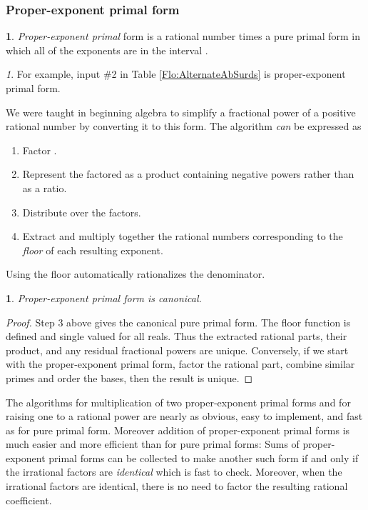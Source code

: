 \documentclass[12pt,english]{article}
\theoremstyle{definition}
\newtheorem*{defn*}{\protect\definitionname}
\theoremstyle{remark}
\newtheorem*{rem*}{\protect\remarkname}
\theoremstyle{plain}
\theoremstyle{plain}
\newtheorem{prop}[thm]{\protect\propositionname}
\providecommand{\definitionname}{Definition}
\providecommand{\propositionname}{Proposition}
\providecommand{\remarkname}{Remark}
\begin{document}
\subsubsection{Proper-exponent primal form\label{sub:Proper-primal-forms}\emph{\vspace{0.3em}
}}
\begin{defn*}
\textsl{Proper-exponent primal} form is a rational number times a
pure primal form in which all of the exponents are in the interval
.\end{defn*}
\begin{rem*}
For example, input \#2 in Table \ref{Flo:AlternateAbSurds} is proper-exponent
primal form.
\end{rem*}
We were taught in beginning algebra to simplify a fractional power
of a positive rational number  by converting it to this
form. The algorithm \textsl{can} be expressed as
\begin{enumerate}
\item Factor .
\item Represent the factored  as a product containing negative powers
rather than as a ratio.
\item Distribute  over the factors.
\item Extract and multiply together the rational numbers corresponding to
the \textsl{floor} of each resulting exponent.
\end{enumerate}
Using the floor automatically rationalizes the denominator.
\begin{prop}
Proper-exponent primal form is canonical.\end{prop}
\begin{proof}
Step 3 above gives the canonical pure primal form. The floor function
is defined and single valued for all reals. Thus the extracted rational
parts, their product, and any residual fractional powers are unique.
Conversely, if we start with the proper-exponent primal form, factor
the rational part, combine similar primes and order the bases, then
the result is unique.
\end{proof}
The algorithms for multiplication of two proper-exponent primal forms
and for raising one to a rational power are nearly as obvious, easy
to implement, and fast as for pure primal form. Moreover addition
of proper-exponent primal forms is much easier and more efficient
than for pure primal forms: Sums of proper-exponent primal forms can
be collected to make another such form if and only if the irrational
factors are \textsl{identical} which is fast to check. Moreover, when
the irrational factors are identical, there is no need to factor the
resulting rational coefficient.
\end{document}
